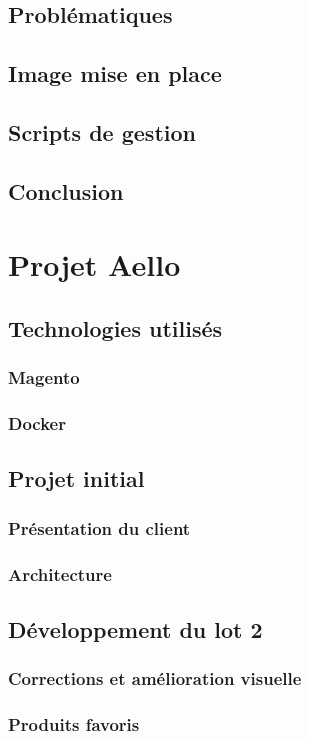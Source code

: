 \documentclass{Article}
\begin{document}
	\subsection{Problématiques}
	\subsection{Image mise en place}
	\subsection{Scripts de gestion}
	\subsection{Conclusion}
\section{Projet Aello}
	\subsection{Technologies utilisés}
		\subsubsection{Magento}
		\subsubsection{Docker}
	\subsection{Projet initial}
		\subsubsection{Présentation du client}
		\subsubsection{Architecture}
	\subsection{Développement du lot 2}
		\subsubsection{Corrections et amélioration visuelle}
		\subsubsection{Produits favoris}
\end{document}
